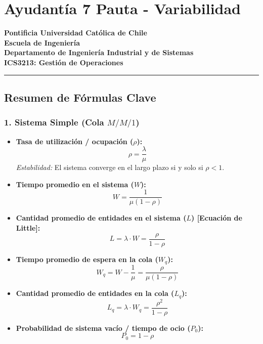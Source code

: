 \documentclass[
]{article}
\author{}
\date{}
\providecommand{\tightlist}{%
  \setlength{\itemsep}{0pt}\setlength{\parskip}{0pt}}
\begin{document}
\hypertarget{ayudantuxeda-7-pauta---variabilidad}{%
\section{Ayudantía 7 Pauta -
Variabilidad}\label{ayudantuxeda-7-pauta---variabilidad}}

\textbf{Pontificia Universidad Católica de Chile}\\
\textbf{Escuela de Ingeniería}\\
\textbf{Departamento de Ingeniería Industrial y de Sistemas}\\
\textbf{ICS3213: Gestión de Operaciones}

\begin{center}\rule{0.5\linewidth}{0.5pt}\end{center}

\hypertarget{resumen-de-fuxf3rmulas-clave}{%
\subsection{Resumen de Fórmulas
Clave}\label{resumen-de-fuxf3rmulas-clave}}

\hypertarget{sistema-simple-cola-mm1}{%
\subsubsection{\texorpdfstring{1. Sistema Simple (Cola
\(M/M/1\))}{1. Sistema Simple (Cola M/M/1)}}\label{sistema-simple-cola-mm1}}

\begin{itemize}
\tightlist
\item
  \textbf{Tasa de utilización / ocupación (\(\rho\)):}
  \[\rho = \frac{\lambda}{\mu}\] \emph{Estabilidad:} El sistema converge
  en el largo plazo si y solo si \(\rho < 1\).
\item
  \textbf{Tiempo promedio en el sistema (\(W\)):}
  \[W = \frac{1}{\mu(1 - \rho)}\]
\item
  \textbf{Cantidad promedio de entidades en el sistema (\(L\))
  {[}Ecuación de Little{]}:}
  \[L = \lambda \cdot W = \frac{\rho}{1 - \rho}\]
\item
  \textbf{Tiempo promedio de espera en la cola (\(W_q\)):}
  \[W_q = W - \frac{1}{\mu} = \frac{\rho}{\mu(1 - \rho)}\]
\item
  \textbf{Cantidad promedio de entidades en la cola (\(L_q\)):}
  \[L_q = \lambda \cdot W_q = \frac{\rho^2}{1 - \rho}\]
\item
  \textbf{Probabilidad de sistema vacío / tiempo de ocio (\(P_0\)):}
  \[P_0 = 1 - \rho\]
\end{itemize}
\end{document}
